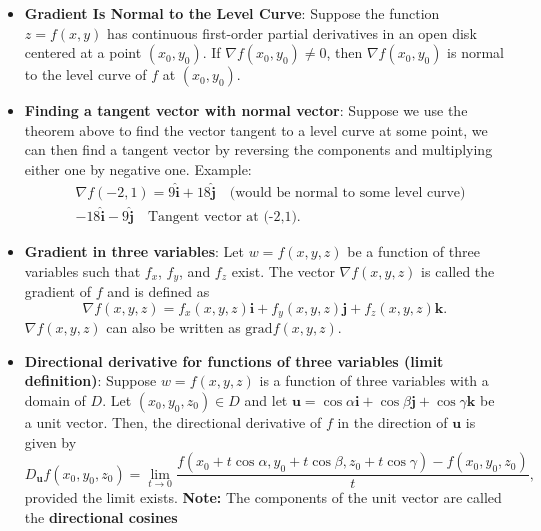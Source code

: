 \documentclass{report}
\begin{document}
\begin{itemize}
\begin{enumerate}
        \end{enumerate}
    \item \textbf{Gradient Is Normal to the Level Curve}:
        Suppose the function $z=f(x,y)$ has continuous first-order partial derivatives in an open disk centered at a point $(x_0,y_0)$. If $\nabla f(x_0,y_0) \neq 0$, then $\nabla f(x_0,y_0)$ is normal to the level curve of $f$ at $(x_0,y_0)$.
    \item \textbf{Finding a tangent vector with normal vector}: Suppose we use the theorem above to find the vector tangent to a level curve at some point, we can then find a tangent vector by reversing the components and multiplying either one by negative one.
        \bigbreak \noindent 
        Example:
        \begin{align*}
            &\nabla f(-2,1) = 9\hat{\mathbf{i}} + 18\hat{\mathbf{j}} \quad \text{(would be normal to some level curve)} \\
            &-18\hat{\mathbf{i}} -9\hat{\mathbf{j}} \quad \text{Tangent vector at (-2,1)}
        .\end{align*}
        \bigbreak \noindent 
    \item \textbf{Gradient in three variables}: 
        Let $w=f(x,y,z)$ be a function of three variables such that $f_x$, $f_y$, and $f_z$ exist. The vector $\nabla f(x,y,z)$ is called the gradient of $f$ and is defined as
        \begin{equation}
            \nabla f(x,y,z) = f_x(x,y,z)\mathbf{i} + f_y(x,y,z)\mathbf{j} + f_z(x,y,z)\mathbf{k}.
        \end{equation}
        $\nabla f(x,y,z)$ can also be written as $\text{grad}f(x,y,z)$.
        \pagebreak 
    \item \textbf{Directional derivative for functions of three variables (limit definition)}:
            Suppose $w=f(x,y,z)$ is a function of three variables with a domain of $D$. Let $(x_0,y_0,z_0) \in D$ and let $\mathbf{u}=\cos\alpha\mathbf{i}+\cos\beta\mathbf{j}+\cos\gamma\mathbf{k}$ be a unit vector. Then, the directional derivative of $f$ in the direction of $\mathbf{u}$ is given by
        \begin{equation}
        D_{\mathbf{u}}f(x_0,y_0,z_0) = \lim_{t \to 0} \frac{f(x_0 + t\cos\alpha, y_0 + t\cos\beta, z_0 + t\cos\gamma) - f(x_0,y_0,z_0)}{t},
        \end{equation}
        provided the limit exists.
        \bigbreak \noindent 
        \textbf{Note:} The components of the unit vector are called the \textbf{directional cosines}

\end{itemize}
\end{document}
